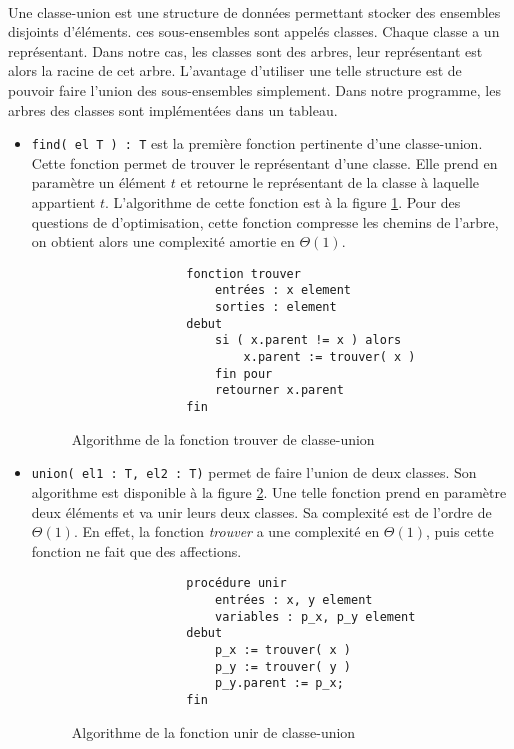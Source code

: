 \documentclass[a4paper]{article}
\begin{document}
		    \paragraph{}{
		    Une classe-union est une structure de données permettant stocker des ensembles 
		    disjoints d'éléments. ces sous-ensembles sont appelés classes. Chaque classe a
		    un représentant. Dans notre cas, les classes sont des arbres, leur représentant
		    est alors la racine de cet arbre. L'avantage d'utiliser une telle structure est
		    de pouvoir faire l'union des sous-ensembles simplement. Dans notre programme, 
		    les arbres des classes sont implémentées dans un tableau.
		    }
		    \begin{itemize}
			    \item \verb|find( el T ) : T| est la première fonction pertinente d'une classe-union. Cette fonction permet de trouver 
	    	le représentant d'une classe. Elle prend en paramètre un élément $t$ et retourne le représentant de la classe à
	    	laquelle appartient $t$.
	    	L'algorithme de cette fonction est à la figure \ref{algo_find}. Pour des questions de d'optimisation, cette fonction
	    	compresse les chemins de l'arbre, on obtient alors une complexité amortie en $\Theta(1)$.
	    	
	    	\begin{figure}
	    	    \begin{verbatim}
	    	    fonction trouver
	    	        entrées : x element
	    	        sorties : element
	    	    debut
	    	        si ( x.parent != x ) alors
	    	            x.parent := trouver( x )
	    	        fin pour
	    	        retourner x.parent
	    	    fin
	    	    \end{verbatim}
	    	\caption{Algorithme de la fonction trouver de classe-union \label{algo_find}}
	    	\end{figure}
	    	
	    	\item \verb|union( el1 : T, el2 : T)| permet de faire l'union de deux classes. Son algorithme est disponible à la 
	        figure \ref{algo_union}. Une telle fonction prend en paramètre deux éléments et va unir leurs deux classes.
	        Sa complexité est de l'ordre de $\Theta(1)$. En effet, la fonction \textit{trouver} a une complexité en $\Theta(1)$,
	        puis cette fonction ne fait que des affections.

	    	\begin{figure}
	    	    \begin{verbatim}
	    	    procédure unir
	    	        entrées : x, y element
	    	        variables : p_x, p_y element
	    	    debut
	    	        p_x := trouver( x )
	    	        p_y := trouver( y )
	    	        p_y.parent := p_x;
	    	    fin
	    	    \end{verbatim}
	    	\caption{Algorithme de la fonction unir de classe-union \label{algo_union}}
	    	\end{figure}
	    	\end{itemize}
		
\end{document}
